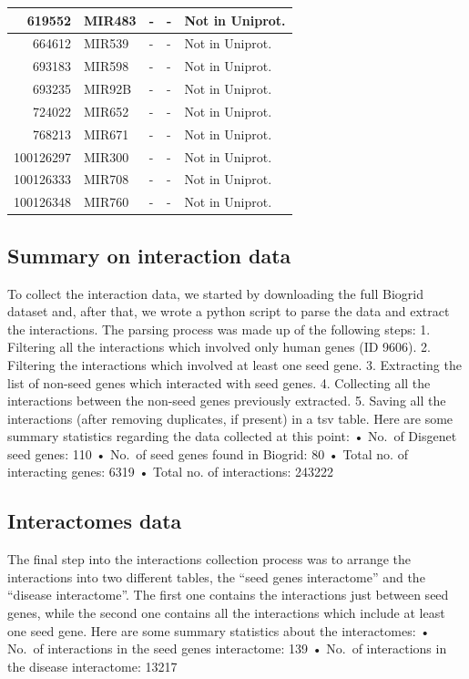 \documentclass[
]{article}
\begin{document}
\begin{table}[H]
\begin{tabular}[t]{r|l|l|l|l}
\hline
619552 & MIR483 & - & - & Not in Uniprot.\\
\hline
664612 & MIR539 & - & - & Not in Uniprot.\\
\hline
693183 & MIR598 & - & - & Not in Uniprot.\\
\hline
693235 & MIR92B & - & - & Not in Uniprot.\\
\hline
724022 & MIR652 & - & - & Not in Uniprot.\\
\hline
768213 & MIR671 & - & - & Not in Uniprot.\\
\hline
100126297 & MIR300 & - & - & Not in Uniprot.\\
\hline
100126333 & MIR708 & - & - & Not in Uniprot.\\
\hline
100126348 & MIR760 & - & - & Not in Uniprot.\\
\hline
\end{tabular}
\end{table}

\hypertarget{summary-on-interaction-data}{%
\subsection{Summary on interaction
data}\label{summary-on-interaction-data}}

To collect the interaction data, we started by downloading the full
Biogrid dataset and, after that, we wrote a python script to parse the
data and extract the interactions. The parsing process was made up of
the following steps: 1. Filtering all the interactions which involved
only human genes (ID 9606). 2. Filtering the interactions which involved
at least one seed gene. 3. Extracting the list of non-seed genes which
interacted with seed genes. 4. Collecting all the interactions between
the non-seed genes previously extracted. 5. Saving all the interactions
(after removing duplicates, if present) in a tsv table. Here are some
summary statistics regarding the data collected at this point: • No.~of
Disgenet seed genes: 110 • No.~of seed genes found in Biogrid: 80 •
Total no. of interacting genes: 6319 • Total no. of interactions: 243222

\hypertarget{interactomes-data}{%
\subsection{Interactomes data}\label{interactomes-data}}

The final step into the interactions collection process was to arrange
the interactions into two different tables, the ``seed genes
interactome'' and the ``disease interactome''. The first one contains
the interactions just between seed genes, while the second one contains
all the interactions which include at least one seed gene. Here are some
summary statistics about the interactomes: • No.~of interactions in the
seed genes interactome: 139 • No.~of interactions in the disease
interactome: 13217
\end{document}
